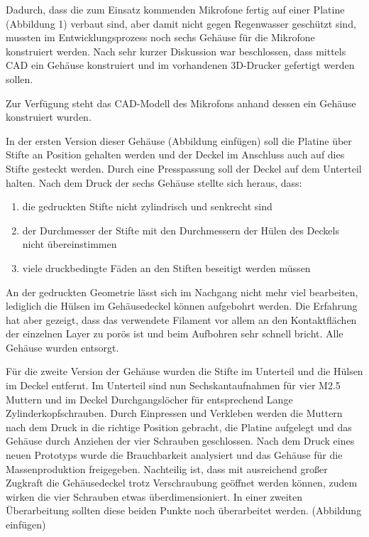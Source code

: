 Dadurch, dass die zum Einsatz kommenden Mikrofone fertig auf einer Platine (Abbildung 1) verbaut sind, aber damit nicht gegen Regenwasser geschützt sind, mussten im Entwicklungsprozess noch sechs Gehäuse für die Mikrofone konstruiert werden. Nach sehr kurzer Diskussion war beschlossen, dass mittels CAD ein Gehäuse konstruiert und im vorhandenen 3D-Drucker gefertigt werden sollen.

Zur Verfügung steht das CAD-Modell des Mikrofons anhand dessen ein Gehäuse konstruiert wurden.

In der ersten Version dieser Gehäuse (Abbildung einfügen) soll die Platine über Stifte an Position gehalten werden und der Deckel im Anschluss auch auf dies Stifte gesteckt werden. Durch eine Presspassung soll der Deckel auf dem Unterteil halten. Nach dem Druck der sechs Gehäuse stellte sich heraus, dass:

\begin{enumerate}
	\item die gedruckten Stifte nicht zylindrisch und senkrecht sind
	\item der Durchmesser der Stifte mit den Durchmessern der Hülen des Deckels nicht übereinstimmen
	\item viele druckbedingte Fäden an den Stiften beseitigt werden müssen
\end{enumerate}

An der gedruckten Geometrie lässt sich im Nachgang nicht mehr viel bearbeiten, lediglich die Hülsen im Gehäusedeckel können aufgebohrt werden. Die Erfahrung hat aber gezeigt, dass das verwendete Filament vor allem an den Kontaktflächen der einzelnen Layer zu porös ist und beim Aufbohren sehr schnell bricht. Alle Gehäuse wurden entsorgt.

Für die zweite Version der Gehäuse wurden die Stifte im Unterteil und die Hülsen im Deckel entfernt. Im Unterteil sind nun Sechskantaufnahmen für vier M2.5 Muttern und im Deckel Durchgangslöcher für entsprechend Lange Zylinderkopfschrauben. Durch Einpressen und Verkleben werden die Muttern nach dem Druck in die richtige Position gebracht, die Platine aufgelegt und das Gehäuse durch Anziehen der vier Schrauben geschlossen. Nach dem Druck eines neuen Prototyps wurde die Brauchbarkeit analysiert und das Gehäuse für die Massenproduktion freigegeben. Nachteilig ist, dass mit ausreichend großer Zugkraft die Gehäusedeckel trotz Verschraubung geöffnet werden können, zudem wirken die vier Schrauben etwas überdimensioniert. In einer zweiten Überarbeitung sollten diese beiden Punkte noch überarbeitet werden. (Abbildung einfügen)

